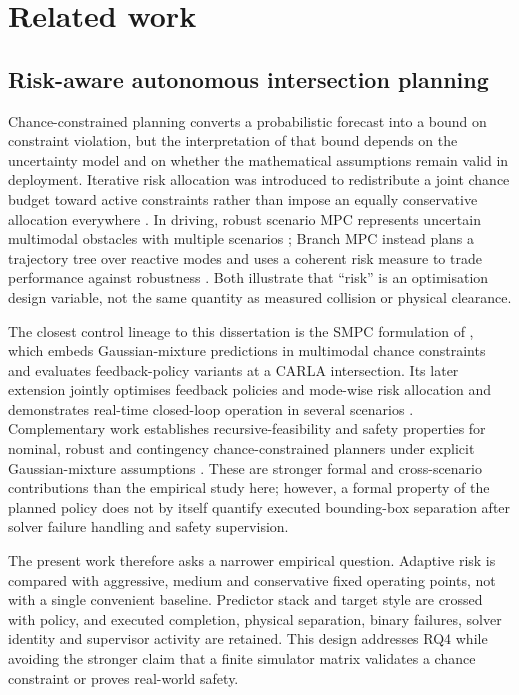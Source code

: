 \section{Related work}
\label{sec:related}

\subsection{Risk-aware autonomous intersection planning}

Chance-constrained planning converts a probabilistic forecast into a bound on
constraint violation, but the interpretation of that bound depends on the
uncertainty model and on whether the mathematical assumptions remain valid in
deployment. Iterative risk allocation was introduced to redistribute a joint
chance budget toward active constraints rather than impose an equally
conservative allocation everywhere \citep{ono2008risk}. In driving, robust
scenario MPC represents uncertain multimodal obstacles with multiple scenarios
\citep{batkovic2021scenario}; Branch MPC instead plans a trajectory tree over
reactive modes and uses a coherent risk measure to trade performance against
robustness \citep{chen2022branch}. Both illustrate that ``risk'' is an
optimisation design variable, not the same quantity as measured collision or
physical clearance.

The closest control lineage to this dissertation is the SMPC formulation of
\citet{nair2022smpc}, which embeds Gaussian-mixture predictions in multimodal
chance constraints and evaluates feedback-policy variants at a CARLA
intersection. Its later extension jointly optimises feedback policies and
mode-wise risk allocation and demonstrates real-time closed-loop operation in
several scenarios \citep{nair2025predictive}. Complementary work establishes
recursive-feasibility and safety properties for nominal, robust and
contingency chance-constrained planners under explicit Gaussian-mixture
assumptions \citep{ren2025recursively}. These are stronger formal and
cross-scenario contributions than the empirical study here; however, a formal
property of the planned policy does not by itself quantify executed
bounding-box separation after solver failure handling and safety supervision.

The present work therefore asks a narrower empirical question. Adaptive risk
is compared with aggressive, medium and conservative fixed operating points,
not with a single convenient baseline. Predictor stack and target style are
crossed with policy, and executed completion, physical separation, binary
failures, solver identity and supervisor activity are retained. This design
addresses RQ4 while avoiding the stronger claim that a finite simulator matrix
validates a chance constraint or proves real-world safety.

